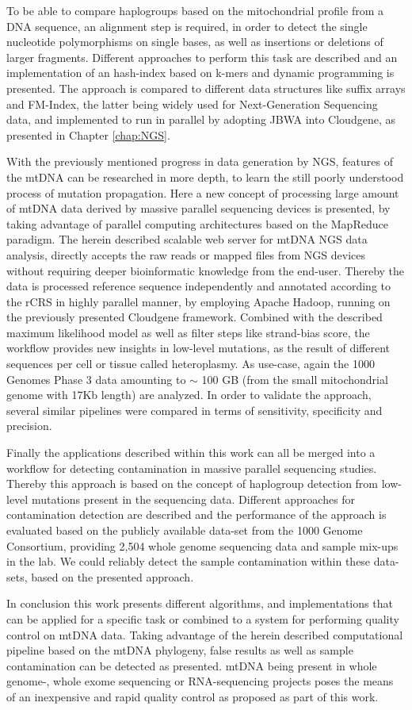 To be able to compare haplogroups based on the mitochondrial profile from a DNA sequence, an alignment step is required, in order to detect the single nucleotide polymorphisms on single bases, as well as insertions or deletions of larger fragments. Different approaches to perform this task are described and an implementation of an hash-index based on k-mers and dynamic programming is presented. The approach is compared to different data structures like suffix arrays and FM-Index, the latter being widely used for Next-Generation Sequencing data, and implemented to run in parallel by adopting JBWA into Cloudgene, as presented in Chapter \ref{chap:NGS}. 

With the previously mentioned progress in data generation by NGS, features of the mtDNA can be researched in more depth, to learn the still poorly understood process of mutation propagation. Here a new concept of processing large amount of mtDNA data derived by massive parallel sequencing devices is presented, by taking advantage of parallel computing architectures based on the MapReduce paradigm. The herein described scalable web server for mtDNA NGS data analysis, directly accepts the raw reads or mapped files from NGS devices without requiring deeper bioinformatic knowledge from the end-user. Thereby the data is processed reference sequence independently and annotated according to the rCRS in highly parallel manner, by employing Apache Hadoop, running on the previously presented Cloudgene framework. Combined with the described maximum likelihood model as well as filter steps like strand-bias score, the workflow provides new insights in low-level mutations, as the result of different sequences per cell or tissue called heteroplasmy. As use-case, again the 1000 Genomes Phase 3 data amounting to $\sim$ 100 GB (from the small mitochondrial genome with 17Kb length) are analyzed. In order to validate the approach, several similar pipelines were compared in terms of sensitivity, specificity and precision. 

Finally the applications described within this work can all be merged into a workflow for detecting contamination in massive parallel sequencing studies. Thereby this approach is based on the concept of haplogroup detection from low-level mutations present in the sequencing data. Different approaches for contamination detection are described and the performance of the approach is evaluated based on the publicly available data-set from the 1000 Genome Consortium, providing 2,504 whole genome sequencing data and sample mix-ups in the lab. We could reliably detect the sample contamination within these data-sets, based on the presented approach.

In conclusion this work presents different algorithms, and implementations that can be applied for a specific task or combined to a system for performing quality control on mtDNA data. Taking advantage of the herein described computational pipeline based on the mtDNA phylogeny, false results as well as sample contamination can be detected as presented. mtDNA being present in whole genome-, whole exome sequencing or RNA-sequencing projects poses the means of an inexpensive and rapid quality control as proposed as part of this work.




